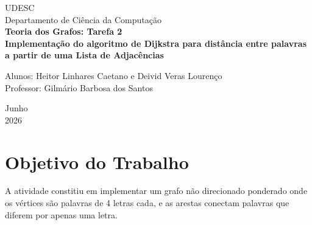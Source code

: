 \documentclass[a4paper, 12pt]{article}
\begin{document}

\begin{titlepage}
	\begin{center}
	
		\Huge{UDESC}\\
		\large{Departamento de Ciência da Computação}\\ 
		\vspace{15pt}
        \vspace{95pt}
        \textbf{\LARGE{Teoria dos Grafos: Tarefa 2}}\\

		\textbf{Implementação do algoritmo de Dijkstra para distância entre palavras
		a partir de uma Lista de Adjacências}
		\vspace{3,5cm}
	\end{center}
	
	\begin{flushleft}
		\begin{tabbing}
			Alunos: Heitor Linhares Caetano e Deivid Veras Lourenço \\
			Professor: Gilmário Barbosa dos Santos \\
	      \setlength{\labelsep}{\leftmargin}
	\end{tabbing}
 \end{flushleft}
	\vspace{1cm}
	
	\begin{center}
		\vspace{\fill}
			 Junho\\
			 2026
			\end{center}
\end{titlepage}


\newpage
\newpage
\tableofcontents
\thispagestyle{empty}

\newpage
{}

\section{Objetivo do Trabalho}
A atividade constitiu em implementar um grafo não direcionado ponderado onde os
vértices são palavras de 4 letras cada, e as arestas conectam palavras que diferem
por apenas uma letra.
\end{document}
